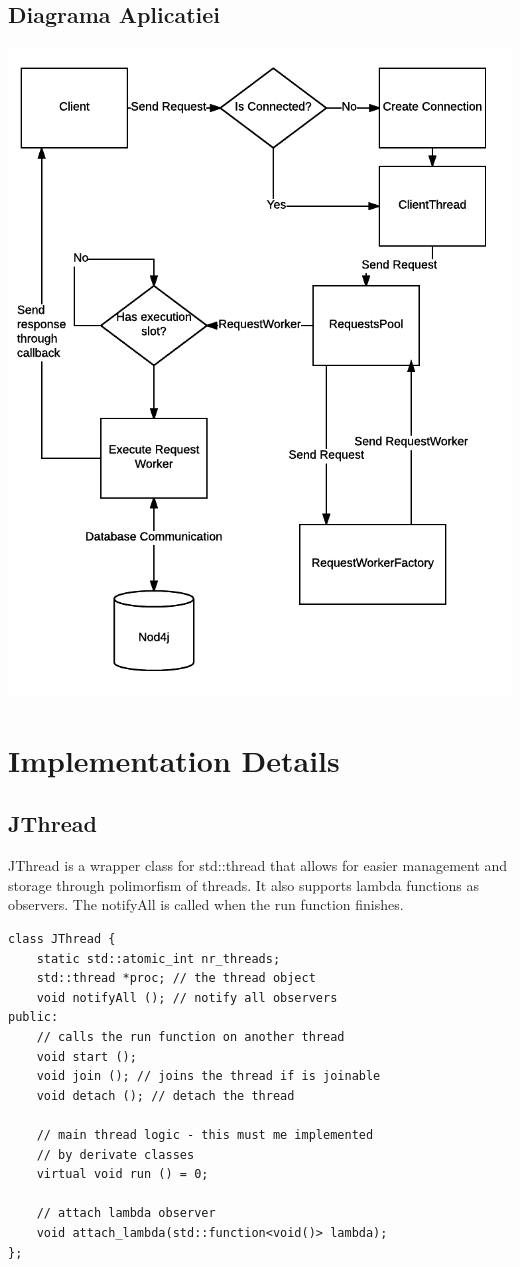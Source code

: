 \documentclass{llncs}
\begin{document}
		\subsection{Diagrama Aplicatiei}
		\includegraphics{MersulTrenurilorDiagram}
		\newpage
	\section{Implementation Details}
		\subsection{JThread}
			JThread is a wrapper class for std::thread that allows for easier management and storage through polimorfism of threads. It also supports lambda functions as observers. The notifyAll is called when the run function finishes.
			\begin{lstlisting}
class JThread {
	static std::atomic_int nr_threads;
	std::thread *proc; // the thread object
	void notifyAll (); // notify all observers
public:
	// calls the run function on another thread
	void start (); 				
	void join (); // joins the thread if is joinable				
	void detach (); // detach the thread
					
	// main thread logic - this must me implemented
	// by derivate classes
	virtual void run () = 0;
	
	// attach lambda observer
	void attach_lambda(std::function<void()> lambda);
};
			\end{lstlisting}
			
\end{document}
